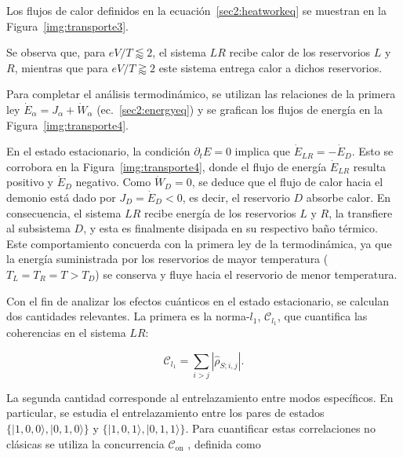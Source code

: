 Los flujos de calor definidos en la ecuación~\eqref{sec2:heatworkeq} se muestran en la Figura~\ref{img:transporte3}.  

    
Se observa que, para $eV/T \lessapprox 2$, el sistema $LR$ recibe calor de los reservorios $L$ y $R$, mientras que para $eV/T \gtrapprox 2$ este sistema entrega calor a dichos reservorios.  

Para completar el análisis termodinámico, se utilizan las relaciones de la primera ley $\dot{E}_{\alpha} = J_{\alpha} + \dot{W}_{\alpha}$ (ec.~\eqref{sec2:energyeq}) y se grafican los flujos de energía en la Figura~\ref{img:transporte4}.  


En el estado estacionario, la condición $\partial_t E = 0$ implica que $\dot{E}_{LR} = -\dot{E}_D$. Esto se corrobora en la Figura~\ref{img:transporte4}, donde el flujo de energía $\dot{E}_{LR}$ resulta positivo y $\dot{E}_D$ negativo. Como $\dot{W}_{D} = 0$, se deduce que el flujo de calor hacia el demonio está dado por $J_D = \dot{E}_D < 0$, es decir, el reservorio $D$ absorbe calor. En consecuencia, el sistema $LR$ recibe energía de los reservorios $L$ y $R$, la transfiere al subsistema $D$, y esta es finalmente disipada en su respectivo baño térmico. Este comportamiento concuerda con la primera ley de la termodinámica, ya que la energía suministrada por los reservorios de mayor temperatura ($T_L = T_R = T > T_D$) se conserva y fluye hacia el reservorio de menor temperatura.  

Con el fin de analizar los efectos cuánticos en el estado estacionario, se calculan dos cantidades relevantes. La primera es la norma-$l_{1}$, $\mathcal{C}_{l_{1}}$, que cuantifica las coherencias en el sistema $LR$:  

\[
\mathcal{C}_{l_{1}} = \sum_{i> j} |\hat{\rho}_{S;i,j}|.
\]

La segunda cantidad corresponde al entrelazamiento entre modos específicos. En particular, se estudia el entrelazamiento entre los pares de estados $\{|1,0,0\rangle, |0,1,0\rangle\}$ y $\{|1,0,1\rangle, |0,1,1\rangle\}$. Para cuantificar estas correlaciones no clásicas se utiliza la concurrencia $\mathcal{C}_{\text{on}}$ \cite{hill1997entanglement, wootters1998entanglement}, definida como  

